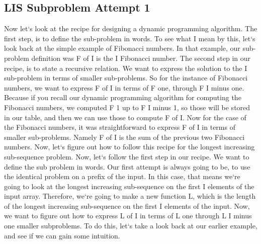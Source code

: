 \subsection{LIS  Subproblem Attempt 1}
Now let`s look at the recipe for designing a dynamic programming algorithm.
The first step, is to define the sub-problem in words.
To see what I mean by this, let`s look back at the simple example of Fibonacci numbers.
In that example, our sub-problem definition was F of I is the I Fibonacci number.
The second step in our recipe, is to state a recursive relation.
We want to express the solution to the I sub-problem in terms of smaller sub-problems.
So for the instance of Fibonacci numbers, we want to express F of I in terms of F one, through F I minus one.
Because if you recall our dynamic programming algorithm for computing the Fibonacci numbers, we computed F 1 up to F I minus 1, so those will be stored in our table, and then we can use those to compute F of I\@.
Now for the case of the Fibonacci numbers, it was straightforward to express F of I in terms of smaller sub-problems.
Namely F of I is the sum of the previous two Fibonacci numbers.
Now, let`s figure out how to follow this recipe for the longest increasing sub-sequence problem.
Now, let`s follow the first step in our recipe.
We want to define the sub problem in words.
Our first attempt is always going to be, to use the identical problem on a prefix of the input.
In this case, that means we`re going to look at the longest increasing sub-sequence on the first I elements of the input array.
Therefore, we`re going to make a new function L, which is the length of the longest increasing sub-sequence on the first I elements of the input.
Now, we want to figure out how to express L of I in terms of L one through L I minus one smaller subproblems.
To do this, let`s take a look back at our earlier example, and see if we can gain some intuition.

